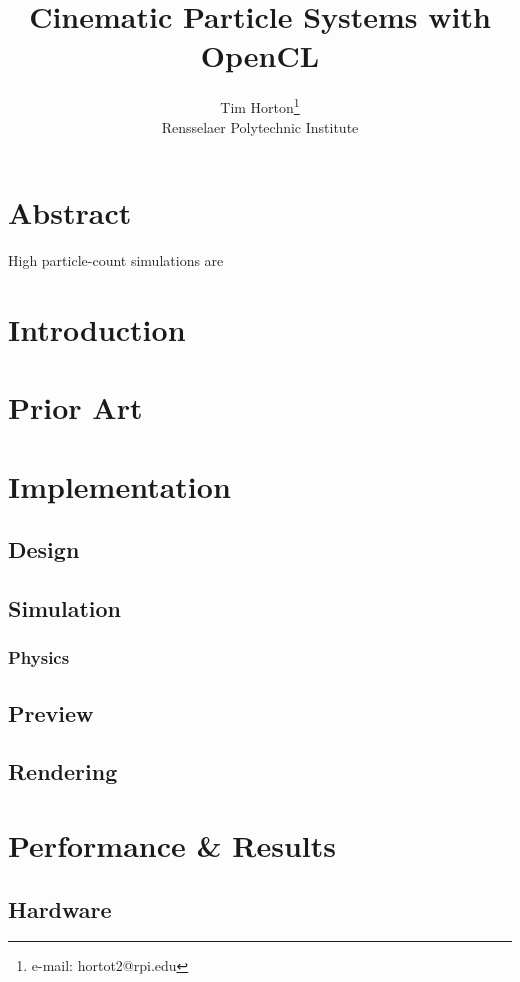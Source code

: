 \documentclass{acmsiggraph}
\title{Cinematic Particle Systems with OpenCL}
\author{Tim Horton\thanks{e-mail: hortot2@rpi.edu}\\Rensselaer Polytechnic Institute}
\begin{document}
\maketitle

\section*{Abstract}

High particle-count simulations are

\section{Introduction}

\section{Prior Art}

\section{Implementation}

\subsection{Design}

\subsection{Simulation}

\subsubsection{Physics}

\subsection{Preview}

\subsection{Rendering}

\section{Performance \& Results}

\subsection{Hardware}
\end{document}
